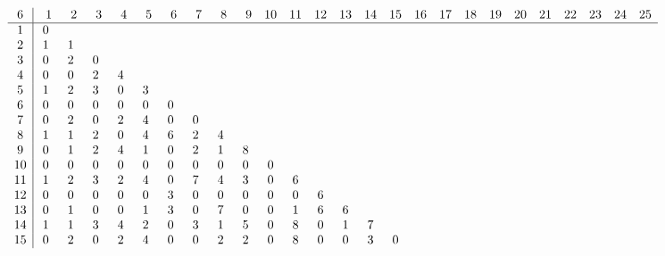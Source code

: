 \begin{landscape}
\[
\begin{array}{c|ccccccccccccccccccccccccc}\addcontentsline{lot}{table}{\protect\numberline{}Dimensions of the Kernel of $\mathcal{L}_{r,c,6}$}
 6&  \phantom{0}1&  \phantom{0}2&  \phantom{0}3&  \phantom{0}4&  \phantom{0}5&  \phantom{0}6&  \phantom{0}7&  \phantom{0}8&  \phantom{0}9& 10& 11& 12& 13& 14& 15& 16& 17& 18& 19& 20& 21& 22& 23& 24& 25\\
\hline
 1&  0&   &   &   &   &   &   &   &   &   &   &   &   &   &   &   &   &   &   &   &   &   &   &   &   \\
 2&  1&  1&   &   &   &   &   &   &   &   &   &   &   &   &   &   &   &   &   &   &   &   &   &   &   \\
 3&  0&  2&  0&   &   &   &   &   &   &   &   &   &   &   &   &   &   &   &   &   &   &   &   &   &   \\
 4&  0&  0&  2&  4&   &   &   &   &   &   &   &   &   &   &   &   &   &   &   &   &   &   &   &   &   \\
 5&  1&  2&  3&  0&  3&   &   &   &   &   &   &   &   &   &   &   &   &   &   &   &   &   &   &   &   \\
 6&  0&  0&  0&  0&  0&  0&   &   &   &   &   &   &   &   &   &   &   &   &   &   &   &   &   &   &   \\
 7&  0&  2&  0&  2&  4&  0&  0&   &   &   &   &   &   &   &   &   &   &   &   &   &   &   &   &   &   \\
 8&  1&  1&  2&  0&  4&  6&  2&  4&   &   &   &   &   &   &   &   &   &   &   &   &   &   &   &   &   \\
 9&  0&  1&  2&  4&  1&  0&  2&  1&  8&   &   &   &   &   &   &   &   &   &   &   &   &   &   &   &   \\
10&  0&  0&  0&  0&  0&  0&  0&  0&  0&  0&   &   &   &   &   &   &   &   &   &   &   &   &   &   &   \\
11&  1&  2&  3&  2&  4&  0&  7&  4&  3&  0&  6&   &   &   &   &   &   &   &   &   &   &   &   &   &   \\
12&  0&  0&  0&  0&  0&  3&  0&  0&  0&  0&  0&  6&   &   &   &   &   &   &   &   &   &   &   &   &   \\
13&  0&  1&  0&  0&  1&  3&  0&  7&  0&  0&  1&  6&  6&   &   &   &   &   &   &   &   &   &   &   &   \\
14&  1&  1&  3&  4&  2&  0&  3&  1&  5&  0&  8&  0&  1&  7&   &   &   &   &   &   &   &   &   &   &   \\
15&  0&  2&  0&  2&  4&  0&  0&  2&  2&  0&  8&  0&  0&  3&  0&   &   &   &   &   &   &   &   &   &   \\

\end{array}\]
\end{landscape}
